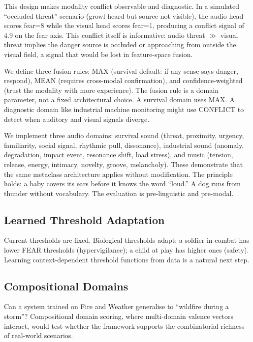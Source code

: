 \documentclass[11pt]{article}
\begin{document}
This design makes modality conflict observable and diagnostic. In a simulated ``occluded threat'' scenario (growl heard but source not visible), the audio head scores fear=8 while the visual head scores fear=1, producing a conflict signal of 4.9 on the fear axis. This conflict itself is informative: audio threat $\gg$ visual threat implies the danger source is occluded or approaching from outside the visual field, a signal that would be lost in feature-space fusion.

We define three fusion rules: MAX (survival default: if any sense says danger, respond), MEAN (requires cross-modal confirmation), and confidence-weighted (trust the modality with more experience). The fusion rule is a domain parameter, not a fixed architectural choice. A survival domain uses MAX. A diagnostic domain like industrial machine monitoring might use CONFLICT to detect when auditory and visual signals diverge.

We implement three audio domains: survival sound (threat, proximity, urgency, familiarity, social signal, rhythmic pull, dissonance), industrial sound (anomaly, degradation, impact event, resonance shift, load stress), and music (tension, release, energy, intimacy, novelty, groove, melancholy). These demonstrate that the same metaclass architecture applies without modification. The principle holds: a baby covers its ears before it knows the word ``loud.'' A dog runs from thunder without vocabulary. The evaluation is pre-linguistic and pre-modal.

\subsection{Learned Threshold Adaptation}

Current thresholds are fixed. Biological thresholds adapt: a soldier in combat has lower FEAR thresholds (hypervigilance); a child at play has higher ones (safety). Learning context-dependent threshold functions from data is a natural next step.

\subsection{Compositional Domains}

Can a system trained on Fire and Weather generalise to ``wildfire during a storm''? Compositional domain scoring, where multi-domain valence vectors interact, would test whether the framework supports the combinatorial richness of real-world scenarios.
\end{document}
